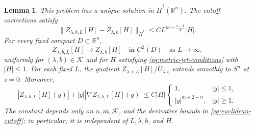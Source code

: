 \documentclass[11pt]{article}
\numberwithin{equation}{section}
\newtheorem{lemma}[theorem]{Lemma}
\theoremstyle{remark}
\newcommand{\R}{\mathbb R}
\newcommand{\Sph}{S}
\newcommand{\norm}[1]{\lVert #1\rVert}
\begin{document}
\begin{lemma}\label{lem:cutoff-response}
{This problem has a unique solution in \(\dot H^1(\R^n)\).
The cutoff corrections satisfy}
\[
 \norm{Z_{\lambda,b,L}[H]-Z_{\lambda,b}[H]}_{\dot H^1}
 \le CL^{m-\frac{n-2}{2}}|H|.
\]
For every fixed compact \(D\subset\R^n\),
\[
 Z_{\lambda,b,L}[H]\to Z_{\lambda,b}[H]
 \quad\text{in }C^2(D)
 \quad\text{as }L\to\infty,
\]
uniformly for \((\lambda,b)\in\mathcal K\) and for \(H\) satisfying
\eqref{eq:metric-jet-conditions} with \(|H|\le1\). {For each fixed
\(L\), the quotient \(Z_{\lambda,b,L}[H]/U_{\lambda,b}\) extends smoothly
to \(\Sph^n\) at \(z=0\).}
Moreover,
{
\[
 |Z_{\lambda,b,L}[H](y)|
 +|y||\nabla Z_{\lambda,b,L}[H](y)|
 \le C|H|
 \begin{cases}
  1,&|y|\le1,\\
  |y|^{m+2-n},&|y|\ge1.
 \end{cases}
\]
}
The constant depends only on \(n,m,\mathcal K\), and the derivative bounds
in \eqref{eq:euclidean-cutoff}; in particular, it is independent of
\(L,\lambda,b\), and \(H\).
\end{lemma}
\end{document}
